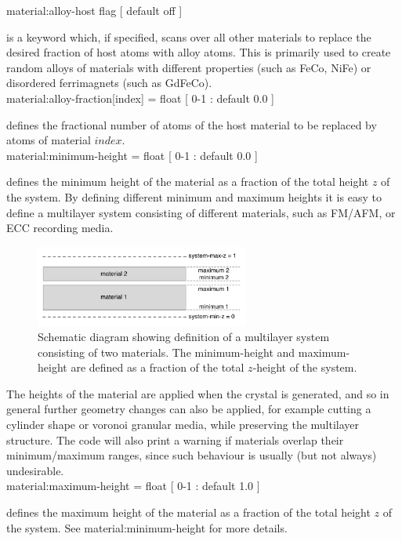 {\zicf material:alloy-host flag [ default off ]} is a keyword which, if specified, scans over all other materials to replace the desired fraction of host atoms with alloy atoms. This is primarily used to create random alloys of materials with different properties (such as FeCo, NiFe) or disordered ferrimagnets (such as GdFeCo).\\


{\zicf material:alloy-fraction[index] = float [ 0-1 : default 0.0 ]} defines the fractional number of atoms of the host material to be replaced by atoms of material $index$.\\

{\zicf material:minimum-height = float [ 0-1 : default 0.0 ]} defines the minimum height of the material as a fraction of the total height $z$ of the system. By defining different minimum and maximum heights it is easy to define a multilayer system consisting of different materials, such as FM/AFM, or ECC recording media.

\begin{figure}[!h]
\center
\includegraphics[width=7cm]{figures/multilayers.pdf}
\caption{Schematic diagram showing definition of a multilayer system consisting of two materials. The minimum-height and maximum-height are defined as a fraction of the total $z$-height of the system.}
\label{fig:multilayer}
\end{figure}

The heights of the material are applied when the crystal is generated, and so in general further geometry changes can also be applied, for example cutting a cylinder shape or voronoi granular media, while preserving the multilayer structure. The code will also print a warning if materials overlap their minimum/maximum ranges, since such behaviour is usually (but not always) undesirable.\\

{\zicf material:maximum-height = float [ 0-1 : default 1.0 ]} defines the maximum height of the material as a fraction of the total height $z$ of the system. See material:minimum-height for more details.\\

